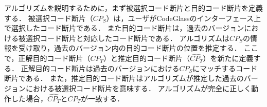 



アルゴリズムを説明するために，まず被選択コード断片と目的コード断片を定義する．
被選択コード断片（$CP_{S}$）は，ユーザがCodeGlassのインターフェース上で選択したコード断片である．
また目的コード断片は，過去のバージョンにおける被選択コード断片と対応したコード断片である．
アルゴリズムは$CP_{S}$の情報を受け取り，過去のバージョン内の目的コード断片の位置を推定する．
ここで，正解目的コード断片（$CP_{T}$）と推定目的コード断片（$\widehat{CP_{T}}$）を新たに定義する．
正解目的コード断片は過去のバージョンにおける$CP_{S}$にマッチするコード断片である．
また，推定目的コード断片はアルゴリズムが推定した過去のバージョンにおける被選択コード断片を意味する．
アルゴリズムが完全に正しく動作した場合，$\widehat{CP_{T}}$と$CP_{T}$が一致する．

